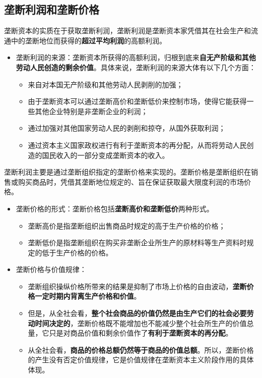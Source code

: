\documentclass[12pt,openany]{ctexbook}
\begin{document}
\subsection{垄断利润和垄断价格}
\begin{mdquote}
垄断资本的实质在于获取垄断利润，垄断利润是垄断资本家凭借其在社会生产和流通中的垄断地位而获得的\textbf{超过平均利润}的高额利润。
\end{mdquote}
\begin{itemize}
  \item 垄断利润的来源：垄断资本所获得的高额利润，归根到底来\textbf{自无产阶级和其他劳动人民创造的剩余价值}。具体来说，垄断利润的来源大体有以下几个方面：
\begin{itemize}
  \item 来自对本国无产阶级和其他劳动人民剥削的加强；
  \item 由于垄断资本可以通过垄断高价和垄断低价来控制市场，使得它能获得一些其他企业特别是非垄断企业的利润；
  \item 通过加强对其他国家劳动人民的剥削和掠夺，从国外获取利润；
  \item 通过资本主义国家政权进行有利于垄断资本的再分配，从而将劳动人民创造的国民收入的一部分变成垄断资本的收入。
\end{itemize}
\end{itemize}
\begin{mdquote}
垄断利润主要是通过垄断组织指定的垄断价格来实现的。垄断价格是垄断组织在销售或购买商品时，凭借其垄断地位规定的、旨在保证获取最大限度利润的市场价格。
\end{mdquote}
\begin{itemize}
  \item 垄断价格的形式：垄断价格包括\textbf{垄断高价和垄断低价}两种形式。
\begin{itemize}
  \item 垄断高价是指垄断组织出售商品时规定的高于生产价格的价格；
  \item 垄断低价是指垄断组织在购买非垄断企业所生产的原材料等生产资料时规定的低于生产价格的价格。
\end{itemize}
  \item 垄断价格与价值规律：
\begin{itemize}
  \item 垄断组织操纵价格所带来的结果是抑制了市场上价格的自由波动，\textbf{垄断价格一定时期内背离生产价格和价值}。
  \item 但是，从全社会看，\textbf{整个社会商品的价值仍然是由生产它们的社会必要劳动时间决定的}，垄断价格既不能增加也不能减少整个社会所生产的价值总量，它只是对商品价值和剩余价值作了\textbf{有利于垄断资本的再分配}。
  \item 从全社会看，\textbf{商品的价格总额仍然等于商品的价值总额}。所以，垄断价格的产生没有否定价值规律，它是价值规律在垄断资本主义阶段作用的具体体现。
\end{itemize}
\end{itemize}
\end{document}

